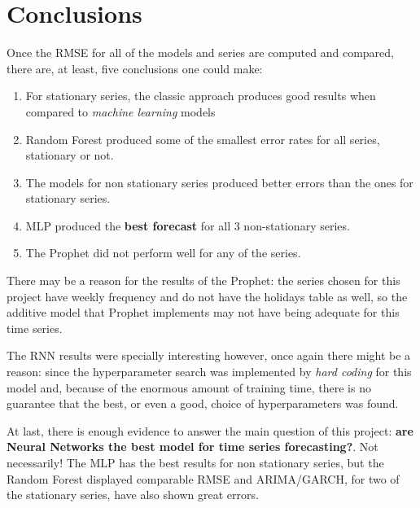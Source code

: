 \documentclass[10pt,twocolumn,letterpaper]{article}
\begin{document}
	
	\section{Conclusions}
	
	Once the RMSE for all of the models and series are computed and compared, there are, at least, five conclusions one could make:
	\begin{enumerate}
		\item For stationary series, the classic approach produces good results when compared to \textit{machine learning} models
		\item Random Forest produced some of the smallest error rates for all series, stationary or not.
		\item The models for non stationary series produced better errors than the ones for stationary series.
		\item MLP produced the \textbf{best forecast} for all 3 non-stationary series.
		\item The Prophet did not perform well for any of the series.
	\end{enumerate}

	There may be a reason for the results of the Prophet: the series chosen for this project have weekly frequency and do not have the holidays table as well, so the additive model that Prophet implements may not have being adequate for this time series.
	
	The RNN results were specially interesting however, once again there might be a reason: since the hyperparameter search was implemented by \textit{hard coding} for this model and, because of the enormous amount of training time, there is no guarantee that the best, or even a good, choice of hyperparameters was found.
	
	At last, there is enough evidence to answer the main question of this project: \textbf{are Neural Networks the best model for time series forecasting?}. Not necessarily! The MLP has the best results for non stationary series, but the Random Forest displayed comparable RMSE and ARIMA/GARCH, for two of the stationary series, have also shown great errors.
	
	{\small
		
		
	}
	

	\appendix
	
	
	
\end{document}
